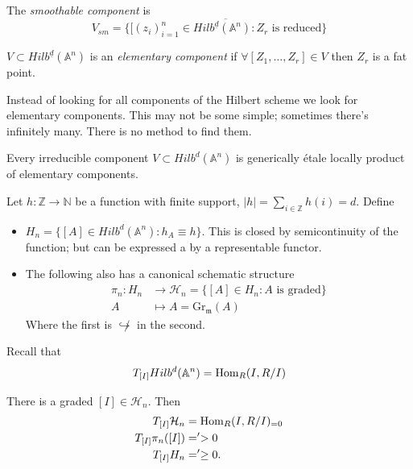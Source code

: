 \medskip\noindent
\begin{definition}
\label{definition-smoothable-component}
The {\it smoothable component} is
 $$
V_{sm}=\overline{\{[(z_i)_{i=1}^n \in
Hilb^{\underline{d}}(\mathbb{A}^n):
Z_r\text{ is reduced}\}}
$$
\end{definition}

\begin{definition}
\label{definition-elementary-componenet}
$V \subset
Hilb^{\underline{d}}(\mathbb{A}^n)$ is
an {\it elementary component} if
$\forall [Z_1,\ldots,Z_r] \in V$
then $Z_r$ is a fat point.
\end{definition}

Instead of looking for all components of the
Hilbert scheme
we look for elementary components. This may
not be some simple;
sometimes there's infinitely many. There
is no method to find them.

\begin{theorem}[Irrabaro]
\label{theorem-I}
Every irreducible component $V \subset
Hilb^d(\mathbb{A}^n)$
is generically étale locally product of
elementary components.
\end{theorem}

\begin{definition}
\label{definition-}
Let $h:\mathbb{Z} \to \mathbb{N}$ be a
function
with finite support, $|h|=\sum_{ i \in
\mathbb{Z}}h(i)=d$. Define
\begin{itemize}
\item $H_n=\{[A] \in Hilb^d(\mathbb{A}^n):
h_A \equiv h\}$.
This is closed by semicontinuity of the
function; but can be expressed
a by a representable functor.
\item The following also has a canonical
schematic structure
$$
\begin{aligned}
\pi_n:H_n  &\longrightarrow
\mathcal{H}_n=\{[A] \in H_n: A\text{ is
graded}\} \\
A &\longmapsto A=\text{Gr}_{\mathfrak{m}}(A)
\end{aligned}
$$
Where the first is $\not\hookrightarrow $ in
the second.
\end{itemize}
\end{definition}

Recall that
$$
T_{[I]}Hilb^d(\mathbb{A}^n)=\mathop{\mathrm{Hom}}\nolimits_R(I,R/I)
$$
\begin{theorem}[B-B,J,G G G L]
\label{theorem-B-B-J-G-G-G-L}
There is a graded $[I] \in \mathcal{H}_n$.
Then
$$
\begin{aligned}
T_{[I]}\mathcal{H}_n&=\mathop{\mathrm{Hom}}\nolimits_R(I,R/I)_{=0}\\
T_{[I]}\pi_n([I])&='>0\\
T_{[I]}H_n&=' \geq 0.
\end{aligned}
$$
\end{theorem}

